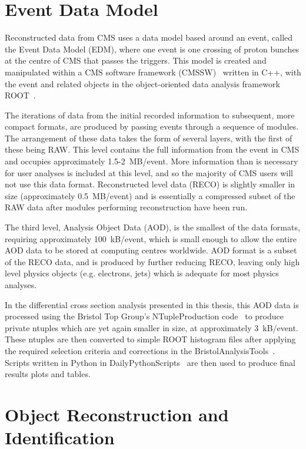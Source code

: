 \section{Event Data Model}
\label{s:Event_Data_Model}
Reconstructed data from CMS uses a data model based around an event, called the Event Data Model (EDM), where
one event is one crossing of proton bunches at the centre of CMS that passes the triggers. This model
is created and manipulated within a CMS software framework (CMSSW)~\cite{cmssw} written in C++, with the event
and related objects in the object-oriented data analysis framework ROOT~\cite{ROOT}.

The iterations of data from the initial recorded information to subsequent, more compact formats, are produced
by passing events through a sequence of modules. The arrangement of these data takes the form of several
layers, with the first of these being RAW. This level contains the full information from the event in CMS and
occupies approximately 1.5-2~MB/event. More information than is necessary for user analyses is included at
this level, and so the majority of CMS users will not use this data format. Reconstructed level data (RECO) is
slightly smaller in size (approximately 0.5~MB/event) and is essentially a compressed subset of the RAW data
after modules performing reconstruction have been run.

The third level, Analysis Object Data (AOD), is the smallest of the data formats, requiring approximately
100~kB/event, which is small enough to allow the entire AOD data to be stored at computing centres worldwide.
AOD format is a subset of the RECO data, and is produced by further reducing RECO, leaving only high level
physics objects (e.g. electrons, jets) which is adequate for most physics analyses. 

In the differential cross section analysis presented in this thesis, this AOD data is processed using the
Bristol Top Group's NTupleProduction code~\cite{NTT_LukeKreczko_SergeySenkin_JesonJacob_EmyrClement_2015} to
produce private ntuples which are yet again smaller in size, at approximately 3~kB/event. These ntuples are
then converted to simple ROOT histogram files after applying the required selection criteria and corrections
in the BristolAnalysisTools~\cite{BAT_LukeKreczko_JesonJacob_SergeySenkin_EmyrClement_2015}. Scripts written
in Python in DailyPythonScripts~\cite{DPS_LukeKreczko_SergeySenkin_JesonJacob_EmyrClement_2015} are then used
to produce final results plots and tables.


\section{Object Reconstruction and Identification}
\label{s:object_reconstruction_and_identification}

